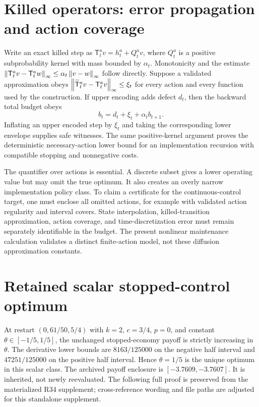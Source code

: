 \section{Killed operators: error propagation and action coverage}
Write an exact killed step as $\mathsf T_t^a v=h_t^a+Q_t^a v$, where $Q_t^a$ is a positive subprobability kernel with mass bounded by $\alpha_t$. Monotonicity and the estimate $\left\|\mathsf T_t^av-\mathsf T_t^aw\right\|_\infty\leq\alpha_t\left\|v-w\right\|_\infty$ follow directly. Suppose a validated approximation obeys $\left\|\widetilde{\mathsf T}_t^av-\mathsf T_t^av\right\|_\infty\leq\xi_t$ for every action and every function used by the construction. If upper encoding adds defect $d_t$, then the backward total budget obeys
\[
 b_t=d_t+\xi_t+\alpha_t b_{t+1}.
\]
Inflating an upper encoded step by $\xi_t$ and taking the corresponding lower envelope supplies safe witnesses. The same positive-kernel argument proves the deterministic necessary-action lower bound for an implementation recursion with compatible stopping and nonnegative costs.

The quantifier over actions is essential. A discrete subset gives a lower operating value but may omit the true optimum. It also creates an overly narrow implementation policy class. To claim a certificate for the continuous-control target, one must enclose all omitted actions, for example with validated action regularity and interval covers. State interpolation, killed-transition approximation, action coverage, and time-discretization error must remain separately identifiable in the budget. The present nonlinear maintenance calculation validates a distinct finite-action model, not these diffusion approximation constants.

\section{Retained scalar stopped-control optimum}\label{sec:boundary}
At restart $(0,61/50,5/4)$ with $k=2$, $c=3/4$, $p=0$, and constant $\theta\in[-1/5,1/5]$, the unchanged stopped-economy payoff is strictly increasing in $\theta$. The derivative lower bounds are $8163/125000$ on the negative half interval and $47251/125000$ on the positive half interval. Hence $\theta=1/5$ is the unique optimum in this scalar class. The archived payoff enclosure is $[-3.7609,-3.7607]$. It is inherited, not newly reevaluated. The following full proof is preserved from the materialized R34 supplement; cross-reference wording and file paths are adjusted for this standalone supplement.


